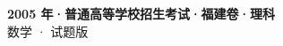 \documentclass[zihao=-4, a4paper]{ctexart}
\begin{document}
\begin{center}
  {\Large\bfseries 2005 年·普通高等学校招生考试·福建卷·理科}\\[4pt]
  {\large 数学 · 试题版}
\end{center}
\medskip
{}

\end{document}
